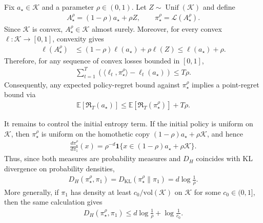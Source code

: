 \documentclass{article}
\theoremstyle{plain}
\theoremstyle{definition}
\theoremstyle{plain}
\newcommand{\Reg}{\mathfrak{R}}
\newcommand{\E}{\mathbb E}
\newcommand{\K}{\mathcal K}
\newcommand{\cL}{\mathcal L}
\begin{document}
Fix $a_\star\in\K$ and a parameter $\rho\in(0,1)$.  Let $Z\sim \operatorname{Unif}(\K)$ and define
\begin{align}
    A_\star^\rho=(1-\rho)a_\star+\rho Z,
    \qquad
    \pi_\star^\rho = \cL(A_\star^\rho).
\end{align}
Since $\K$ is convex, $A_\star^\rho\in\K$ almost surely.  Moreover, for every convex
$\ell:\K\to[0,1]$, convexity gives
\begin{align}
    \ell(A_\star^\rho)
     & \leq
    (1-\rho)\ell(a_\star)+\rho\ell(Z)
    \leq
    \ell(a_\star)+\rho .
\end{align}
Therefore, for any sequence of convex losses bounded in $[0,1]$,
\begin{align}
    \sum_{t=1}^T
    \left(
    \langle \ell_t,\pi_\star^\rho\rangle-
    \ell_t(a_\star)
    \right)
    \leq
    T\rho .
    \label{eq:homothetic_comparator_bias}
\end{align}
Consequently, any expected policy-regret bound against $\pi_\star^\rho$ implies a point-regret bound via
\begin{align}
    \E[\Reg_T(a_\star)]
    \leq
    \E[\Reg_T(\pi_\star^\rho)] + T\rho .
    \label{eq:point_regret_from_policy_regret}
\end{align}

It remains to control the initial entropy term.  If the initial policy is uniform on $\K$, then
$\pi_\star^\rho$ is uniform on the homothetic copy $(1-\rho)a_\star+\rho\K$, and hence
\begin{align}
    \frac{d\pi_\star^\rho}{d\pi_1}(x)
    =
    \rho^{-d}\mathbf 1\{x\in (1-\rho)a_\star+\rho\K\}.
\end{align}
Thus, since both measures are probability measures and $D_H$ coincides with KL divergence on
probability densities,
\begin{align}
    D_H(\pi_\star^\rho,\pi_1)
    =
    D_{\mathrm{KL}}(\pi_\star^\rho\|\pi_1)
    =
    d\log\frac{1}{\rho}.
    \label{eq:homothetic_comparator_entropy_uniform}
\end{align}
More generally, if $\pi_1$ has density at least $c_0/\mathrm{vol}(\K)$ on $\K$ for some $c_0\in(0,1]$,
then the same calculation gives
\begin{align}
    D_H(\pi_\star^\rho,\pi_1)
    \leq
    d\log\frac{1}{\rho}+
    \log\frac{1}{c_0}.
    \label{eq:homothetic_comparator_entropy_lower_bounded_prior}
\end{align}
\end{document}
